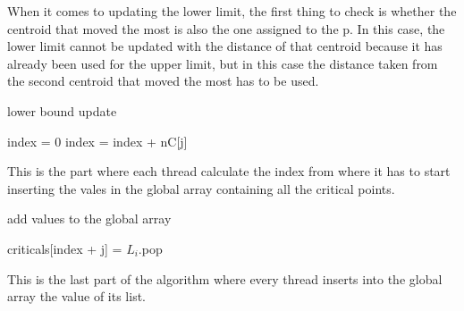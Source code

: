 \documentclass{report}
\begin{document}
\begin{minipage}[b]{0.48\textwidth}
    When it comes to updating the lower limit, the first thing to check is whether the centroid that moved the most is also the one assigned to the p. In this case, the lower limit cannot be updated with the distance of that centroid because it has already been used for the upper limit, but in this case the distance taken from the second centroid that moved the most has to be used.

    \begin{algorithm}[H]
      \caption{lower bound update}
      \begin{algorithmic}
        \State index = 0
          \State index = index + nC[j]
        \EndFor
      \end{algorithmic}
    \end{algorithm}

    This is the part where each thread calculate the index from where it has to start inserting the vales in the global array containing all the critical points.

    \begin{algorithm}[H]
      \caption{add values to the global array}
      \begin{algorithmic}
          \State criticals[index + j] = $L_i$.pop 
        \EndFor       
      \end{algorithmic}
    \end{algorithm}
    This is the last part of the algorithm where every thread inserts into the global array the value of its list.
  \end{minipage}
  \hspace{0.1in}
\end{document}
